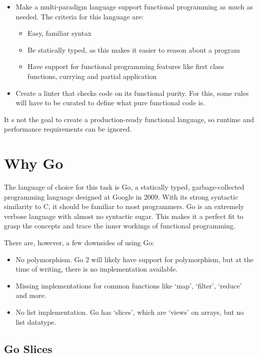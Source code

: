 \begin{itemize}
    \item Make a multi-paradigm language support functional programming as much as needed.
        The criteria for this language are:
    \begin{itemize}
        \item Easy, familiar syntax
        \item Be statically typed, as this makes it easier to reason about a program
        \item Have support for functional programming features like first class functions, currying
            and partial application
    \end{itemize}
    \item Create a linter that checks code on its functional purity. For this, some rules will have
        to be curated to define what pure functional code is.
\end{itemize}

It s not the goal to create a production-ready functional language, so runtime and performance requirements
can be ignored.

\section{Why Go}

The language of choice for this task is Go, a statically typed, garbage-collected programming language
designed at Google in 2009\autocite{golang-publish}. With its strong syntactic similarity to C, it should
be familiar to most programmers.
Go is an extremely verbose language with almost no syntactic sugar. This makes it a perfect fit to
grasp the concepts and trace the inner workings of functional programming.

There are, however, a few downsides of using Go:

\begin{itemize}
    \item No polymorphism. Go 2 will likely have support for polymorphism, but at the time of writing,
        there is no implementation available.
    \item Missing implementations for common functions like `map', `filter', `reduce' and more.
    \item No list implementation. Go has `slices', which are `views' on arrays, but
        no list datatype.
\end{itemize}

\subsection{Go Slices}

